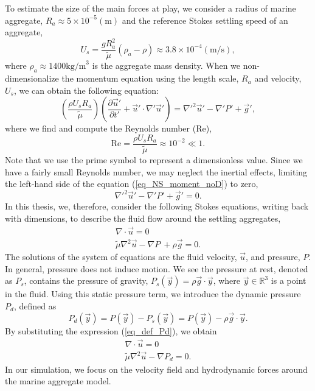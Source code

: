 To estimate the size of the main forces at play, we consider a radius of marine aggregate, $R_a \approx 5 \times 10^{-5} (\text{m})$ and the reference Stokes settling speed of an aggregate,
\begin{equation}
    U_s =  \frac{gR_a^2}{{\tilde{\mu}}} (\rho_a-\rho) \approx 3.8 \times 10^{-4} ({\text{m/s}}),
	\label{eq_U_s}
\end{equation}
where $\rho_a \approx 1400\text{kg/m}^3$ is the aggregate mass density. 
When we non-dimensionalize the momentum equation using the length scale, $R_a$ and velocity, $U_s$, we can obtain the following equation:
\begin{equation}
	\left(\frac{\rho U_s R_a}{{\tilde{\mu}}} \right) 
   \left( 
   \frac{\partial \vec{u}'}{\partial t'} + \vec{u}'\cdot \nabla' \vec{u}'
\right)
 = {\nabla'}^2 \vec{u}' - \nabla' P' +  \vec{g}',
 \label{eq_NS_moment_noD}
\end{equation}
where we find and compute the Reynolds number (Re),
\begin{equation}
	\text{Re} = \frac{\rho U_s R_a}{{\tilde{\mu}}} \approx 10^{-2}
	\ll 1.
   \label{eq_Re}
\end{equation}
Note that we use the prime symbol to represent a dimensionless value.
Since we have a fairly small Reynolds number, we may neglect the inertial effects, limiting the left-hand side of the equation (\ref{eq_NS_moment_noD}) to zero,
\begin{equation}
   {\nabla'}^2 \vec{u}' - \nabla' P' +  \vec{g}' = 0.
\end{equation}
In this thesis, we, therefore, consider the following Stokes equations, writing back with dimensions, to describe the fluid flow around the settling aggregates,
 \begin{align}
	\nabla \cdot \vec{u}  = 0  
	\nonumber \\
	{\tilde{\mu}} \nabla^2 \vec{u}    - \nabla P\ + \rho  \vec{g} = 0.
	\label{eq_stokes2}
\end{align}
The solutions of the system of equations are the fluid velocity, $\vec{u}$, and pressure, $P$. In general, pressure does not induce motion. We see the pressure at rest, denoted as $P_s$, contains the pressure of gravity,  $P_s(\vec{y}) = \rho \vec{g} \cdot \vec{y}$, where $\vec{y} \in \mathbb{R}^3$ is a point in the fluid. Using this static pressure term, we introduce the dynamic pressure $P_d$, defined as 
\begin{equation}
   P_d(\vec{y}) = P(\vec{y}) - P_s(\vec{y}) = P(\vec{y}) - \rho \vec{g} \cdot \vec{y}.
   \label{eq_def_Pd}
\end{equation}
By substituting the expression (\ref{eq_def_Pd}), we obtain
\begin{align}
	\nabla \cdot \vec{u}  = 0  
	\nonumber \\
	{\tilde{\mu}} \nabla^2 \vec{u}    - \nabla P_d = 0.
	\label{eq_stokes3}
\end{align}
In our simulation, we focus on the velocity field and hydrodynamic forces around the marine aggregate model. 
